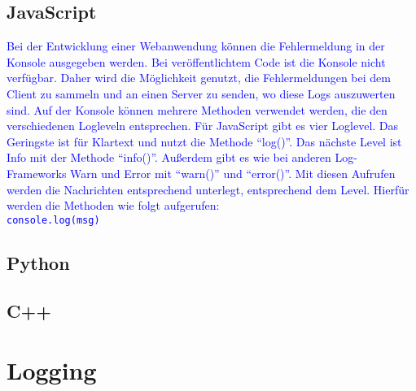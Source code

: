 \subsection{JavaScript}\label{subsec:javascript}
\textcolor{blue}{
    Bei der Entwicklung einer Webanwendung können die Fehlermeldung in der Konsole ausgegeben werden.
    Bei veröffentlichtem Code ist die Konsole nicht verfügbar.
    Daher wird die Möglichkeit genutzt, die Fehlermeldungen bei dem Client zu sammeln und an einen Server zu senden, wo diese Logs auszuwerten sind.
    Auf der Konsole können mehrere Methoden verwendet werden, die den verschiedenen Logleveln entsprechen.
    Für JavaScript gibt es vier Loglevel.
    Das Geringste ist für Klartext und nutzt die Methode \enquote{log()}.
    Das nächste Level ist Info mit der Methode \enquote{info()}.
    Außerdem gibt es wie bei anderen Log-Frameworks Warn und Error mit \enquote{warn()} und \enquote{error()}.
    Mit diesen Aufrufen werden die Nachrichten entsprechend unterlegt, entsprechend dem Level.
    Hierfür werden die Methoden wie folgt aufgerufen:
    \\
    \hspace*{10mm}
    \texttt{console.log(msg)}
}\autocite{stackify}

\subsection{Python}\label{subsec:python}
\textcolor{blue}{
}
\subsection{C++}\label{subsec:c++}


\section{Logging}\label{sec:logging-verfahren}

